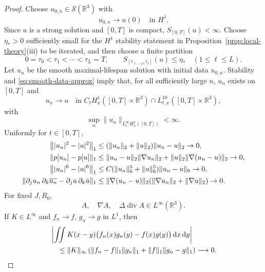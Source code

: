 \documentclass{interact}
\numberwithin{equation}{section}
\theoremstyle{plain}
\theoremstyle{definition}
\theoremstyle{remark}
\newcommand{\R}{\mathbb R}
\newcommand{\Sspace}{\mathcal S}
\newcommand{\dd}{\,\mathrm d}
\begin{document}
\begin{proof}
Choose $u_{0,n}\in\Sspace(\R^3)$ with
\begin{equation}\label{eq:smooth-data-approx}
 u_{0,n}\to u(0)\quad\text{in }H^1.
\end{equation}
Since $u$ is a strong solution and $[0,T]$ is compact, $S_{[0,T]}(u)<\infty$. Choose $\eta_*>0$ sufficiently small for the $H^1$ stability statement in Proposition~\ref{prop:local-theory}(iii) to be iterated, and then choose a finite partition
\[
 0=\tau_0<\tau_1<\cdots<\tau_L=T,
 \qquad
 S_{[\tau_{\ell-1},\tau_\ell]}(u)\le\eta_*
 \quad(1\le\ell\le L).
\]
Let $u_n$ be the smooth maximal-lifespan solution with initial data $u_{0,n}$. Stability and \eqref{eq:smooth-data-approx} imply that, for all sufficiently large $n$, $u_n$ exists on $[0,T]$ and
\begin{equation}\label{eq:H1-solution-convergence}
 u_n\to u
 \quad\text{in }C_tH_x^1([0,T]\times\R^3)
 \cap L^{10}_{t,x}([0,T]\times\R^3),
\end{equation}
with
\begin{equation}\label{eq:uniform-H1-approximants}
 \sup_n\|u_n\|_{L_t^\infty H_x^1([0,T])}<\infty.
\end{equation}
Uniformly for $t\in[0,T]$,
\begin{align}
 \bigl\||u_n|^2-|u|^2\bigr\|_1
 &\le(\|u_n\|_2+\|u\|_2)\|u_n-u\|_2\to0,
 \label{eq:mass-density-convergence}\\
 \|p[u_n]-p[u]\|_1
 &\le\|u_n-u\|_2\|\nabla u_n\|_2
   +\|u\|_2\|\nabla(u_n-u)\|_2\to0,\notag\\
 \bigl\||u_n|^6-|u|^6\bigr\|_1
 &\le C(\|u_n\|_6^5+\|u\|_6^5)\|u_n-u\|_6\to0,\notag\\
 \|\partial_ju_n\,\partial_k\overline{u_n}
   -\partial_ju\,\partial_k\bar u\|_1
 &\le\|\nabla(u_n-u)\|_2
       (\|\nabla u_n\|_2+\|\nabla u\|_2)\to0.
 \label{eq:stress-density-convergence}
\end{align}
For fixed $J,R_0$,
\begin{equation}\label{eq:fixed-kernel-bounded}
 A,\quad\nabla A,\quad\Delta\operatorname{div}A\in L^\infty(\R^3).
\end{equation}
If $K\in L^\infty$ and $f_n\to f$, $g_n\to g$ in $L^1$, then
\begin{align}
 &\left|\iint K(x-y)\bigl(f_n(x)g_n(y)-f(x)g(y)\bigr)\dd x\dd y\right|
 \notag\\
 &\quad\le\|K\|_\infty
 \left(\|f_n-f\|_1\|g_n\|_1
       +\|f\|_1\|g_n-g\|_1\right)
 \longrightarrow0.
 \label{eq:bounded-kernel-product-convergence}

\end{align}
\end{proof}
\end{document}
